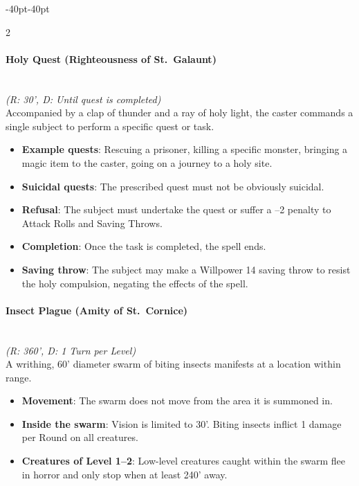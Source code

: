 \documentclass{book}
\providecommand{\tightlist}{%
\setlength{\itemsep}{0pt}\setlength{\parskip}{0pt}}
\begin{document}
\begin{adjustwidth}{-40pt}{-40pt}
\begin{multicols}{2}
\paragraph{Holy Quest (Righteousness of
	St.~Galaunt)}\label{holy-quest-righteousness-of-st.-galaunt}\mbox{}\\
\emph{(R: 30', D: Until quest is completed)}\\
Accompanied by a clap of thunder and a ray of holy light, the caster
commands a single subject to perform a specific quest or task.

\begin{itemize}
	\tightlist
	\item
	\textbf{Example quests}: Rescuing a prisoner, killing a specific
	monster, bringing a magic item to the caster, going on a journey to a
	holy site.
	\item
	\textbf{Suicidal quests}: The prescribed quest must not be obviously
	suicidal.
	\item
	\textbf{Refusal}: The subject must undertake the quest or suffer a --2
	penalty to Attack Rolls and Saving Throws.
	\item
	\textbf{Completion}: Once the task is completed, the spell ends.
	\item
	\textbf{Saving throw}: The subject may make a Willpower 14 saving
	throw to resist the holy compulsion, negating the effects of the
	spell.
\end{itemize}

\paragraph{Insect Plague (Amity of
	St.~Cornice)}\label{insect-plague-amity-of-st.-cornice}\mbox{}\\
\emph{(R: 360', D: 1 Turn per Level)}\\
A writhing, 60' diameter swarm of biting insects manifests at a location
within range.

\begin{itemize}
	\tightlist
	\item
	\textbf{Movement}: The swarm does not move from the area it is
	summoned in.
	\item
	\textbf{Inside the swarm}: Vision is limited to 30'. Biting insects
	inflict 1 damage per Round on all creatures.
	\item
	\textbf{Creatures of Level 1--2}: Low-level creatures caught within
	the swarm flee in horror and only stop when at least 240' away.
\end{itemize}


\end{multicols}
\end{adjustwidth}
\end{document}
